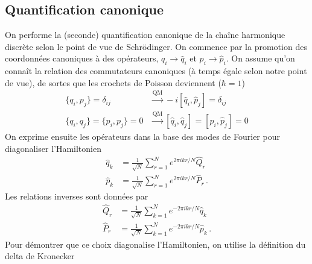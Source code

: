 \documentclass{article}
\numberwithin{equation}{section}
\theoremstyle{solution}
\begin{document}
\subsection{Quantification canonique}
On performe la (seconde) quantification canonique de la chaîne harmonique discrète selon le point de vue de Schrödinger. 
On commence par la promotion des coordonnées canoniques à des opérateurs, 
$q_i \rightarrow \hat{q}_i$ et $p_i \rightarrow \hat{p}_i$. On assume qu'on connaît la relation des commutateurs canoniques (à temps égale selon notre point de vue), 
de sortes que les crochets de Poisson deviennent ($\hbar = 1$)
\begin{equation}\label{eq:ccr}
\begin{split}
        \{q_i, p_j\} = \delta_{ij} &\overset{\mathrm{QM}}{\longrightarrow } -i[\hat{q}_i, \hat{p}_j] = \delta_{ij}\\
        \{q_i, q_j\} = \{p_i, p_j\} = 0 &\overset{\mathrm{QM}}{\longrightarrow } [\hat{q}_i, \hat{q}_j] = [\hat{p}_i, \hat{p}_j] = 0
\end{split}
\end{equation} 
On exprime ensuite les opérateurs dans la base des modes de Fourier pour diagonaliser l'Hamiltonien
\begin{equation}\label{eq:op fourier}
\begin{split}
        \hat{q}_k &= \frac{1}{\sqrt{N}} \sum_{r=1}^{N} e^{2\pi i kr / N}\hat{Q}_r \\
        \hat{p}_k &= \frac{1}{\sqrt{N}}\sum_{r=1}^{N} e^{2\pi i kr / N}\hat{P}_r\, .
\end{split}
\end{equation} 
Les relations inverses sont données par
\begin{equation}
\begin{split}
        \hat{Q}_r &= \frac{1}{\sqrt{N}}\sum_{k=1}^{N} e^{-2\pi i kr / N}\hat{q}_k \\
        \hat{P}_r &= \frac{1}{\sqrt{N}}\sum_{k=1}^{N} e^{-2\pi i kr / N}\hat{p}_k\, .
\end{split}
\end{equation} 
Pour démontrer que ce choix diagonalise l'Hamiltonien, on utilise la définition du delta de Kronecker
\end{document}
